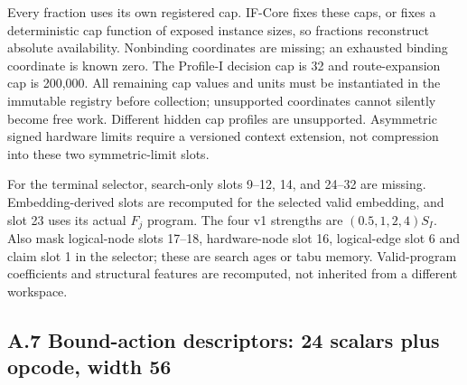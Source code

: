 \documentclass[10pt,a4paper]{article}
\begin{document}
\endgroup

Every fraction uses its own registered cap. IF-Core fixes these caps, or
fixes a deterministic cap function of exposed instance sizes, so
fractions reconstruct absolute availability. Nonbinding coordinates are
missing; an exhausted binding coordinate is known zero. The Profile-I
decision cap is 32 and route-expansion cap is 200,000. All remaining cap
values and units must be instantiated in the immutable registry before
collection; unsupported coordinates cannot silently become free work.
Different hidden cap profiles are unsupported. Asymmetric signed
hardware limits require a versioned context extension, not compression
into these two symmetric-limit slots.

For the terminal selector, search-only slots 9--12, 14, and 24--32 are
missing. Embedding-derived slots are recomputed for the selected valid
embedding, and slot 23 uses its actual \(F_j\) program. The four v1
strengths are \((0.5,1,2,4)S_I\). Also mask logical-node slots 17--18,
hardware-node slot 16, logical-edge slot 6 and claim slot 1 in the
selector; these are search ages or tabu memory. Valid-program
coefficients and structural features are recomputed, not inherited from
a different workspace.

\hypertarget{a.7-bound-action-descriptors-24-scalars-plus-opcode-width-56}{%
\subsection*{A.7 Bound-action descriptors: 24 scalars plus opcode, width
56}\label{a.7-bound-action-descriptors-24-scalars-plus-opcode-width-56}}

\begingroup\small
\end{document}
